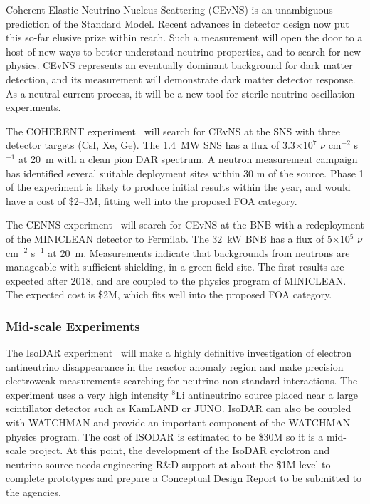 
\noindent Coherent Elastic Neutrino-Nucleus Scattering (CEvNS) is an
unambiguous prediction of the Standard Model. Recent advances in
detector design now put this so-far elusive prize within reach. Such a
measurement will open the door to a host of new ways to better
understand neutrino properties, and to search for new physics. CEvNS
represents an eventually dominant background for dark matter
detection, and its measurement will demonstrate dark matter detector
response. As a neutral current process, it will be a new tool for
sterile neutrino oscillation experiments.

The COHERENT experiment~\cite{Akimov:2013yow} will search for CEvNS at the
SNS with three detector targets (CsI, Xe, Ge). The 1.4~MW SNS has a
flux of 3.3$\times$10$^{7}$ $\nu$ cm$^{-2}$ s$^{-1}$ at 20~m with a
clean pion DAR spectrum. A neutron measurement campaign has identified
several suitable deployment sites within 30 m of the source. Phase 1
of the experiment is likely to produce initial results within the
year, and would have a cost of \$2--3M, fitting well into the proposed
FOA category.

The CENNS experiment~\cite{Brice:2013fwa} will search for CEvNS at the
BNB with a redeployment of the MINICLEAN detector to Fermilab. The
32~kW BNB has a flux of 5$\times$10$^{5}$ $\nu$ cm$^{-2}$ s$^{-1}$ at
20~m. Measurements indicate that backgrounds from neutrons are
manageable with sufficient shielding, in a green field site. The first
results are expected after 2018, and are coupled to the physics
program of MINICLEAN. The expected cost is \$2M, which fits well into
the proposed FOA category.

\subsubsection{Mid-scale Experiments}


\noindent The IsoDAR experiment~\cite{IsoDAR,IsoDARJuno} will make a
highly definitive investigation of electron antineutrino disappearance
in the reactor anomaly region and make precision electroweak
measurements searching for neutrino non-standard interactions. The
experiment uses a very high intensity $^8$Li antineutrino source placed
near a large scintillator detector such as KamLAND or JUNO. IsoDAR
can also be coupled with WATCHMAN and provide an important component
of the WATCHMAN physics program. The cost of ISODAR is estimated to
be \$30M so it is a mid-scale project. At this point, the development
of the IsoDAR cyclotron and neutrino source needs engineering R\&D
support at about the \$1M level to complete prototypes and prepare a
Conceptual Design Report to be submitted to the agencies.

